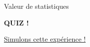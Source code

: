 \documentclass{BeamerTemplate}
\begin{document}
\begin{frame}[t]{Valeur de statistiques}
    
\centerline{\LARGE\bf\alert{QUIZ !}}

  \vspace{2mm}
 
\vfill
    \href{https://jmiron-moyechnorm.share.connect.posit.cloud/}{Simulons cette expérience !}
    
\end{frame}











\end{document}

